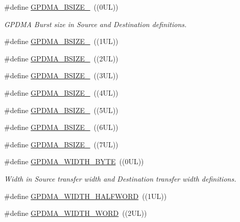 \begin{DoxyCompactItemize}
\item 
\#define \hyperlink{group___g_p_d_m_a__18_x_x__43_x_x_gafd44c148b998d28bc156b947794ad011}{G\+P\+D\+M\+A\+\_\+\+B\+S\+I\+Z\+E\+\_}~((0\+U\+L))
\begin{DoxyCompactList}\small\item\em G\+P\+D\+MA Burst size in Source and Destination definitions. \end{DoxyCompactList}\item 
\#define \hyperlink{group___g_p_d_m_a__18_x_x__43_x_x_ga768f1f0d1cf1a2611573362ed7b6a18d}{G\+P\+D\+M\+A\+\_\+\+B\+S\+I\+Z\+E\+\_}~((1\+U\+L))
\item 
\#define \hyperlink{group___g_p_d_m_a__18_x_x__43_x_x_ga21239562985215b67c024871f804f0bd}{G\+P\+D\+M\+A\+\_\+\+B\+S\+I\+Z\+E\+\_}~((2\+U\+L))
\item 
\#define \hyperlink{group___g_p_d_m_a__18_x_x__43_x_x_ga6a56379136d5416a0799642fa2217fe2}{G\+P\+D\+M\+A\+\_\+\+B\+S\+I\+Z\+E\+\_}~((3\+U\+L))
\item 
\#define \hyperlink{group___g_p_d_m_a__18_x_x__43_x_x_ga2ebaf7a771f5bf603ecfed0503a66c5c}{G\+P\+D\+M\+A\+\_\+\+B\+S\+I\+Z\+E\+\_}~((4\+U\+L))
\item 
\#define \hyperlink{group___g_p_d_m_a__18_x_x__43_x_x_gababd7d98382dd69ae09a9a4b447a0977}{G\+P\+D\+M\+A\+\_\+\+B\+S\+I\+Z\+E\+\_}~((5\+U\+L))
\item 
\#define \hyperlink{group___g_p_d_m_a__18_x_x__43_x_x_ga808a32404cd29d656eb9ee31dacacdbb}{G\+P\+D\+M\+A\+\_\+\+B\+S\+I\+Z\+E\+\_}~((6\+U\+L))
\item 
\#define \hyperlink{group___g_p_d_m_a__18_x_x__43_x_x_gad11cb83bebe2dc426f62cded244ea391}{G\+P\+D\+M\+A\+\_\+\+B\+S\+I\+Z\+E\+\_}~((7\+U\+L))
\item 
\#define \hyperlink{group___g_p_d_m_a__18_x_x__43_x_x_gacc6deb5ab0e06eded3cdd151754db8f0}{G\+P\+D\+M\+A\+\_\+\+W\+I\+D\+T\+H\+\_\+\+B\+Y\+TE}~((0\+U\+L))
\begin{DoxyCompactList}\small\item\em Width in Source transfer width and Destination transfer width definitions. \end{DoxyCompactList}\item 
\#define \hyperlink{group___g_p_d_m_a__18_x_x__43_x_x_gab28fc48561886a87a1c87eeb7078ef8b}{G\+P\+D\+M\+A\+\_\+\+W\+I\+D\+T\+H\+\_\+\+H\+A\+L\+F\+W\+O\+RD}~((1\+U\+L))
\item 
\#define \hyperlink{group___g_p_d_m_a__18_x_x__43_x_x_gad611897f330a6ec01b0699b244b132bb}{G\+P\+D\+M\+A\+\_\+\+W\+I\+D\+T\+H\+\_\+\+W\+O\+RD}~((2\+U\+L))

\end{DoxyCompactItemize}
